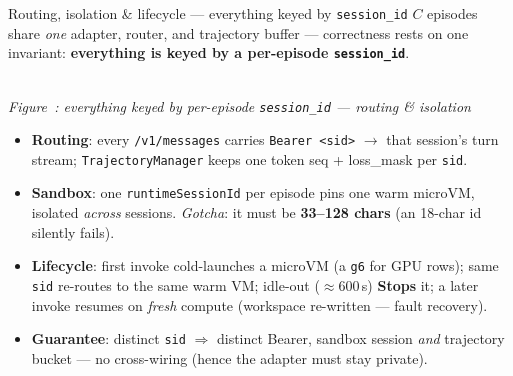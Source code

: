 \documentclass[aspectratio=169]{beamer}
\newcounter{deckfig}
\newcommand{\figtag}[1]{\refstepcounter{deckfig}%
  {\scriptsize\itshape Figure~\thedeckfig: #1}}
\begin{document}
\begin{frame}{Routing, isolation \& lifecycle --- everything keyed by \texttt{session\_id}}
  \footnotesize $C$ episodes share \emph{one} adapter, router, and trajectory buffer --- correctness
  rests on one invariant: \textbf{everything is keyed by a per-episode \texttt{session\_id}}.
  \begin{center}
  \\[0.1em]\figtag{everything keyed by per-episode \texttt{session\_id} --- routing \& isolation}
  \end{center}
  \vspace{-0.35em}
  \begin{itemize}\setlength\itemsep{0.05em}
    \item \textbf{Routing}: every \texttt{/v1/messages} carries \texttt{Bearer <sid>} $\to$ that
      session's turn stream; \texttt{TrajectoryManager} keeps one token seq + loss\_mask per \texttt{sid}.
    \item \textbf{Sandbox}: one \texttt{runtimeSessionId} per episode pins one warm microVM, isolated
      \emph{across} sessions. \emph{Gotcha}: it must be \textbf{33--128 chars} (an 18-char id silently fails).
    \item \textbf{Lifecycle}: first invoke cold-launches a microVM (a \texttt{g6} for GPU rows); same
      \texttt{sid} re-routes to the same warm VM; idle-out ($\approx$600\,s) \textbf{Stops} it; a later
      invoke resumes on \emph{fresh} compute (workspace re-written --- fault recovery).
    \item \textbf{Guarantee}: distinct \texttt{sid} $\Rightarrow$ distinct Bearer, sandbox session
      \emph{and} trajectory bucket --- no cross-wiring (hence the adapter must stay private).
  \end{itemize}
\end{frame}
\end{document}
